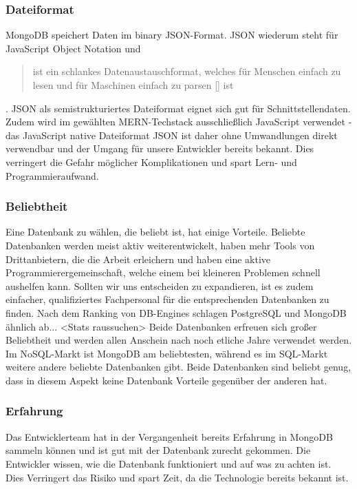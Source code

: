 \subsubsection{Dateiformat}
MongoDB speichert Daten im \glqq binary JSON\grqq -Format. JSON wiederum steht für \glqq JavaScript Object Notation \grqq und 
\begin{quote}
    ist ein schlankes Datenaustauschformat, welches für Menschen einfach zu lesen und für Maschinen einfach zu parsen [] ist
\end{quote} \cite{JSON1}. 
JSON als semistrukturiertes Dateiformat eignet sich gut für Schnittstellendaten. Zudem wird im gewählten MERN-Techstack ausschließlich JavaScript verwendet - das JavaScript native Dateiformat JSON ist daher ohne Umwandlungen direkt verwendbar und der Umgang für unsere Entwickler bereits bekannt. Dies verringert die Gefahr möglicher Komplikationen und spart Lern- und Programmieraufwand.

\subsubsection{Beliebtheit}
Eine Datenbank zu wählen, die beliebt ist, hat einige Vorteile. Beliebte Datenbanken werden meist aktiv weiterentwickelt, haben mehr Tools von Drittanbietern, die die Arbeit erleichern und haben eine aktive Programmierergemeinschaft, welche einem bei kleineren Problemen schnell aushelfen kann. Sollten wir uns entscheiden zu expandieren, ist es zudem einfacher, qualifiziertes Fachpersonal für die entsprechenden Datenbanken zu finden.
Nach dem Ranking von DB-Engines schlagen PostgreSQL und MongoDB ähnlich ab... <Stats raussuchen>
Beide Datenbanken erfreuen sich großer Beliebtheit und werden allen Anschein nach noch etliche Jahre verwendet werden. Im NoSQL-Markt ist MongoDB am beliebtesten, während es im SQL-Markt weitere andere beliebte Datenbanken gibt. Beide Datenbanken sind beliebt genug, dass in diesem Aspekt keine Datenbank Vorteile gegenüber der anderen hat.

\subsubsection{Erfahrung}
Das Entwicklerteam hat in der Vergangenheit bereits Erfahrung in MongoDB sammeln können und ist gut mit der Datenbank zurecht gekommen. Die Entwickler wissen, wie die Datenbank funktioniert und auf was zu achten ist. Dies Verringert das Risiko und spart Zeit, da die Technologie bereits bekannt ist.

